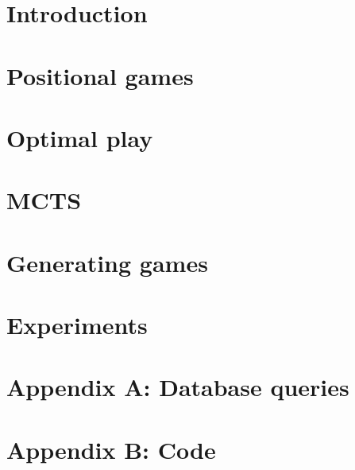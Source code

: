 \documentclass[12pt]{article}
\begin{document}
\section{Introduction}
\label{sec:introduction}


\section{Positional games}
\label{sec:positional_games}


\section{Optimal play}
\label{sec:optimal_play}


\section{MCTS}
\label{sec:mcts}


\section{Generating games}
\label{sec:generating_games}


\section{Experiments}
\label{sec:experiments}

\pagebreak
% 



\pagebreak
\section{Appendix A: Database queries}
\label{sec:database_queries}

\pagebreak
\section{Appendix B: Code}
\label{sec:code}

\end{document}
